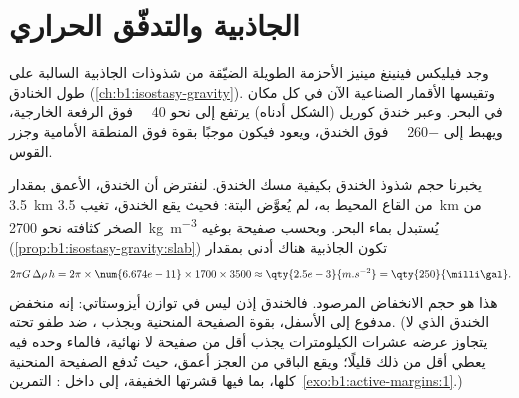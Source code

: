 \section{الجاذبية والتدفّق الحراري}\label{sec:b1:active-margins:gravity-heat}

وجد فيليكس فينينغ مينيز الأحزمة الطويلة الضيّقة من شذوذات الجاذبية السالبة على طول الخنادق (\cref{ch:b1:isostasy-gravity}). وتقيسها الأقمار الصناعية الآن في كل مكان في البحر. وعبر خندق كوريل (الشكل أدناه) يرتفع  إلى نحو \qty{40}{\milli\gal} فوق الرفعة الخارجية، ويهبط إلى \qty{-260}{\milli\gal} فوق الخندق، ويعود فيكون موجبًا بقوة فوق المنطقة الأمامية وجزر القوس.

يخبرنا حجم شذوذ الخندق بكيفية مسك الخندق. لنفترض أن الخندق، الأعمق بمقدار \qty{3.5}{km} من القاع المحيط به، لم يُعوَّض البتة: فحيث يقع الخندق، تغيب \qty{3.5}{km} من الصخر كثافته نحو
\qty{2700}{kg.m^{-3}} يُستبدل بماء البحر. وبحسب صفيحة بوغيه (\cref{prop:b1:isostasy-gravity:slab}) تكون الجاذبية هناك أدنى بمقدار
\[
  2\pi G\,\Delta\rho\,h = 2\pi \times \num{6.674e-11} \times 1700 \times 3500
  \approx \qty{2.5e-3}{m.s^{-2}} = \qty{250}{\milli\gal} .
\]
هذا هو حجم الانخفاض المرصود. فالخندق إذن ليس في توازن أيزوستاتي: إنه منخفض مدفوع إلى الأسفل، بقوة الصفيحة المنحنية وبجذب ، ضد طفو  تحته. (الخندق الذي لا يتجاوز عرضه عشرات الكيلومترات يجذب أقل من صفيحة لا نهائية، فالماء وحده فيه يعطي أقل من ذلك قليلًا؛ ويقع الباقي من العجز أعمق، حيث تُدفع الصفيحة المنحنية كلها، بما فيها قشرتها الخفيفة، إلى داخل : التمرين~\ref{exo:b1:active-margins:1}.)


